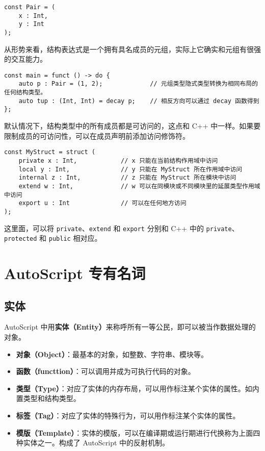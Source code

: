 \begin{lstlisting}
const Pair = (
	x : Int,
	y : Int
);
\end{lstlisting}

从形势来看，结构表达式是一个拥有具名成员的元组，实际上它确实和元组有很强的交互能力。

\begin{lstlisting}
const main = funct () -> do {
	auto p : Pair = (1, 2);				// 元组类型隐式类型转换为相同布局的任何结构类型。
	auto tup : (Int, Int) = decay p;	// 相反方向可以通过 decay 函数得到
};
\end{lstlisting}

默认情况下，结构类型中的所有成员都是可访问的，这点和 C++ 中一样。如果要限制成员的可访问性，可以在成员声明前添加访问修饰符。

\begin{lstlisting}
const MyStruct = struct (
	private x : Int,			// x 只能在当前结构作用域中访问
	local y : Int,				// y 只能在 MyStruct 所在作用域中访问
	internal z : Int, 			// z 只能在 MyStruct 所在模块中访问
	extend w : Int,				// w 可以在同模块或不同模块里的延展类型作用域中访问
	export u : Int				// 可以在任何地方访问
);
\end{lstlisting}

这里面，可以将 \lstinline!private!、\lstinline!extend! 和 \lstinline!export! 分别和 C++ 中的 \lstinline!private!、\lstinline!protected! 和 \lstinline!public! 相对应。

\chapter{AutoScript 专有名词}

\section{实体}

AutoScript 中用\textbf{实体（Entity）}来称呼所有一等公民，即可以被当作数据处理的对象。

\begin{itemize}
    \item \textbf{对象（Object）}：最基本的对象，如整数、字符串、模块等。

    \item \textbf{函数（functtion）}：可以调用并成为可执行代码的对象。

    \item \textbf{类型（Type）}：对应了实体的内存布局，可以用作标注某个实体的属性。如内置类型和结构类型。

    \item \textbf{标签（Tag）}：对应了实体的特殊行为，可以用作标注某个实体的属性。

    \item \textbf{模版（Template）}：实体的模版，可以在编译期或运行期进行代换称为上面四种实体之一。构成了 AutoScript 中的反射机制。
\end{itemize}


